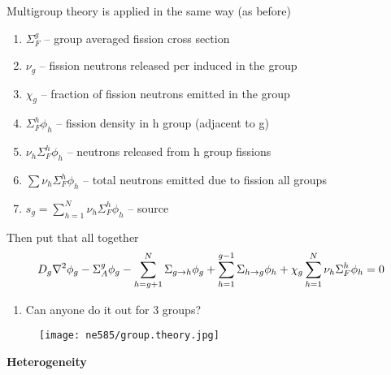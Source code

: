 \documentclass[aspectratio=1610,pdftex,dvipsnames,compress,xcolor={dvipsnames}]{beamer}
\begin{document}
\begin{frame}{Multigroup theory is applied in the same way (as before)}
    \begin{enumerate}[series=outerlist,topsep=0pt,itemsep=21pt,leftmargin=*,label=(\arabic*)]
        \item[]$\Sigma_F^g$ -- group averaged fission cross section
        \item[]$\nu_g$ -- fission neutrons released per induced in the group
        \item[]$\chi_g$ -- fraction of fission neutrons emitted in the group
        \item[]$\Sigma_F^h \phi_h$ -- fission density in h group (adjacent to g)
        \item[]$\nu_h \Sigma_F^h \phi_h$ -- neutrons released from h group fissions
        \item[]$\sum \nu_h \Sigma_F^h \phi_h$ -- total neutrons emitted due to fission all groups
        \item[]$s_g = \sum_{h=1}^N \nu_h \Sigma_F^h \phi_h$ -- source
    \end{enumerate}
\end{frame}


\begin{frame}{Then put that all together}
    \begin{equation}
        \Large
        D_g \nabla^2 \phi_g - \Sigma_A^g \phi_g - \sum_{h=g + 1}^N \Sigma_{g \rightarrow h}\phi_g + \sum_{h=1}^{g-1} \Sigma_{h \rightarrow g} \phi_h + \chi_g \sum_{h=1}^N \nu_h \Sigma_F^h \phi_h = 0
    \end{equation}

    \vspace*{\fill}

    \begin{enumerate}[series=outerlist,topsep=0pt,itemsep=21pt,leftmargin=*,label=(\arabic*)]
        \item[] Can anyone do it out for 3 groups?
    \end{enumerate}
\end{frame}


\begin{frame}{}
    \begin{figure}
        \centering
        \texttt{[image: ne585/group.theory.jpg]}
    \end{figure}
\end{frame}


\begin{frame}[plain]{}
    \centering\LARGE\textbf{Heterogeneity}
\end{frame}
\end{document}
